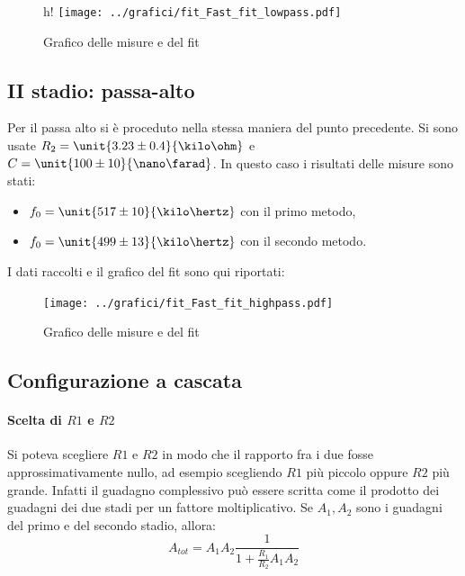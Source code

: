 \documentclass[10pt,a4paper]{article}
\begin{document}
\begin{figure}{h!}
	\centering
	\texttt{[image: ../grafici/fit\_Fast\_fit\_lowpass.pdf]}
	\caption{Grafico delle misure e del fit}
\end{figure}

\subsection{II stadio: passa-alto}
Per il passa alto si è proceduto nella stessa maniera del punto precedente. Si sono usate $R_2=\unit{3.23 \pm 0.4}{\kilo\ohm}$ e $C=\unit{100 \pm 10}{\nano\farad}$.
In questo caso i risultati delle misure sono stati:
\begin{itemize}
	\item $f_0 = \unit{517 \pm 10}{\kilo\hertz}$ con il primo metodo,
	\item $f_0 = \unit{499 \pm 13}{\kilo\hertz}$ con il secondo metodo.
\end{itemize}

I dati raccolti e il grafico del fit sono qui riportati:

\begin{figure}[h!]
	\centering
	
\end{figure}
	
\begin{figure}[h!]
	\centering
	\texttt{[image: ../grafici/fit\_Fast\_fit\_highpass.pdf]}
	\caption{Grafico delle misure e del fit}
\end{figure}
\subsection{Configurazione a cascata}

\paragraph{Scelta di $R1$ e $R2$} Si poteva scegliere $R1$ e $R2$ in modo che il rapporto fra i due fosse approssimativamente nullo, ad esempio scegliendo $R1$ più piccolo oppure $R2$ più grande.
Infatti il guadagno complessivo può essere scritta come il prodotto dei guadagni dei due stadi per un fattore moltiplicativo. Se $A_1, A_2$ sono i guadagni del primo e del secondo stadio, allora:
\begin{equation*}
A_{tot} = A_1 A_2 \frac{1}{1 + \frac{R_1}{R_2} A_1 A_2}
\end{equation*}


\end{document}
